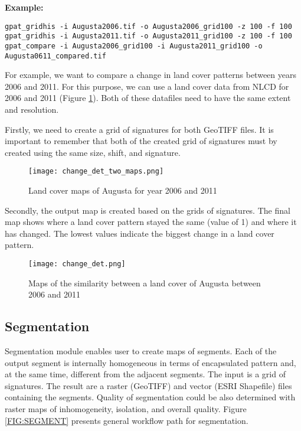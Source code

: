 {\bf Example:}

\begin{minipage}{\linewidth}
\begin{lstlisting}
gpat_gridhis -i Augusta2006.tif -o Augusta2006_grid100 -z 100 -f 100
gpat_gridhis -i Augusta2011.tif -o Augusta2011_grid100 -z 100 -f 100
gpat_compare -i Augusta2006_grid100 -i Augusta2011_grid100 -o Augusta0611_compared.tif
\end{lstlisting}
\end{minipage}

For example, we want to compare a change in land cover patterns between years 2006 and 2011. 
For this purpose, we can use a land cover data from NLCD for 2006 and 2011 (Figure \ref{FIG:CHANGEDET1}).
Both of these datafiles need to have the same extent and resolution.

Firstly, we need to create a grid of signatures for both GeoTIFF files.
It is important to remember that both of the created grid of signatures must by created using the same size, shift, and signature.

\begin{figure}[H]
	\centering
	\texttt{[image: change\_det\_two\_maps.png]}
	\caption{Land cover maps of Augusta for year 2006 and 2011}
	\label{FIG:CHANGEDET1}
\end{figure}

Secondly, the output map is created based on the grids of signatures.
The final map shows where a land cover pattern stayed the same (value of 1) and where it has changed. 
The lowest values indicate the biggest change in a land cover pattern.

\begin{figure}[H]
	\centering
	\texttt{[image: change\_det.png]}
	\caption{Maps of the similarity between a land cover of Augusta between 2006 and 2011}
	\label{FIG:CHANGEDET2}
\end{figure}

\FloatBarrier

\subsection{Segmentation \label{segmentation}}

Segmentation module enables user to create maps of segments.
Each of the output segment is internally homogeneous in terms of encapsulated pattern and, at the same time, different from the adjacent segments.
The input is a grid of signatures.
The result are a raster (GeoTIFF) and vector (ESRI Shapefile) files containing the segments.
Quality of segmentation could be also determined with raster maps of inhomogeneity, isolation, and overall quality.
Figure \ref{FIG:SEGMENT} presents general workflow path for segmentation. 

